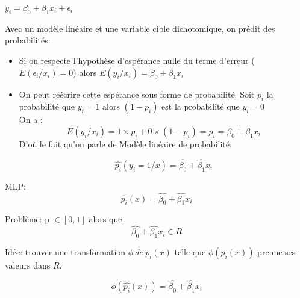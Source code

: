 \documentclass[12pt,aspectratio=1610]{beamer}
\begin{document}
\begin{frame}{}

\centering 	$ y_i=\beta_0+\beta_1x_i+\epsilon_i $
	
	Avec un modèle linéaire et une variable cible dichotomique, on prédit des probabilités: 
	\begin{itemize}

		\item Si on respecte l'hypothèse d'espérance nulle du terme d'erreur ($E(\epsilon_i/x_i)=0$) alors $E(y_i/x_i)=\beta_0+\beta_1x_i$
		
		\item On peut réécrire cette espérance sous forme de probabilité.
		Soit $p_i$ la probabilité que $y_i=1$ alors $(1-p_i)$ est la probabilité que $y_i=0$ \\
		
		On a : 
		$$ E(y_i/x_i)=1 \times p_i + 0 \times (1-p_i)=p_i=\beta_0+\beta_1x_i$$
		D'où le fait qu'on parle de Modèle linéaire de probabilité:
		
$$\hat{p_i}(y_i=1/x)=\hat{\beta_0}+\hat{\beta_1}x_i$$
	\end{itemize}
\end{frame}

\begin{frame}
	
	MLP: $$\hat{p_i}(x)=\hat{\beta_0}+\hat{\beta_1}x_i$$
	
\pause
	Problème: p $\in [0, 1]$ alors que: $$\hat{\beta_0}+\hat{\beta_1}x_i \in R$$
	
	Idée:  trouver une transformation $\phi~de~ p_i(x)$ telle que $\phi(p_i(x))$ prenne 	ses valeurs dans $R$.
	
	\begin{equation*}
		\phi(\hat{p_i}(x))= \hat{\beta_0}+\hat{\beta_1}x_i
	\end{equation*}
	
\end{frame}
\end{document}
